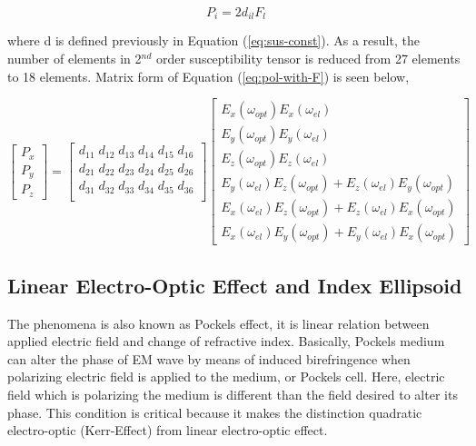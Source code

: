 \documentclass[thesis]{deutez}
\begin{document}
    \begin{equation}
        P_i = 2d_{il} F_l
        \label{eq:pol-with-F}
    \end{equation}
    
    where d is defined previously in Equation (\ref{eq:sus-const}). As a result, the number of elements in 2$^{nd}$ order susceptibility tensor is reduced from 27 elements to 18 elements.  Matrix form of Equation (\ref{eq:pol-with-F}) is seen below,

    \begin{equation}
    \begin{bmatrix}
        P_x \\
        P_y \\
        P_z 
    \end{bmatrix}
    =
    \begin{bmatrix}
        d_{11} \; d_{12} \; d_{13} \; d_{14} \; d_{15} \; d_{16} \\
        d_{21} \; d_{22} \; d_{23} \; d_{24} \; d_{25} \; d_{26} \\
        d_{31} \; d_{32} \; d_{33} \; d_{34} \; d_{35} \; d_{36} \\
    \end{bmatrix}
    \begin{bmatrix}
        E_x(\omega_{opt})E_x(\omega_{el}) \\
        E_y(\omega_{opt})E_y(\omega_{el}) \\
        E_z(\omega_{opt})E_z(\omega_{el}) \\
        E_y(\omega_{el})E_z(\omega_{opt})+E_z(\omega_{el})E_y(\omega_{opt}) \\
        E_x(\omega_{el})E_z(\omega_{opt})+E_z(\omega_{el})E_x(\omega_{opt}) \\
        E_x(\omega_{el})E_y(\omega_{opt})+E_y(\omega_{el})E_x(\omega_{opt})
    \end{bmatrix}
    \label{eq:F_matrix_equation}
    \end{equation}

    \subsection{Linear Electro-Optic Effect and Index Ellipsoid}
    
    The phenomena is also known as Pockels effect, it is linear relation between applied electric field and change of refractive index. Basically, Pockels medium can alter the phase of EM wave by means of induced birefringence when polarizing electric field is applied to the medium, or Pockels cell. Here, electric field which is polarizing the medium is different than the field desired to alter its phase. This condition is critical because it makes the distinction quadratic electro-optic (Kerr-Effect) from linear electro-optic effect.
    
\end{document}
